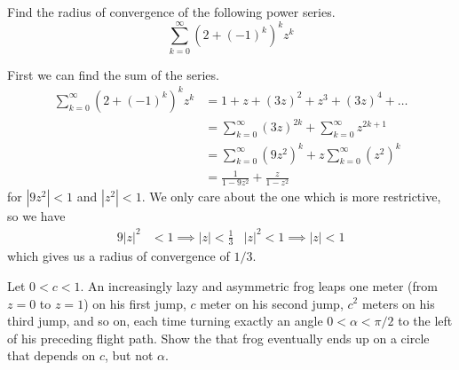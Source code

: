 \documentclass[12pt]{article}
\author{Warren Atkison}
\date{\today}
\newenvironment{exercise}[2][Exercise]{\begin{trivlist}
\item[\hskip \labelsep {\bfseries #1} \hskip \labelsep {\bfseries #2.}]}{\end{trivlist}}
\begin{document}
\fancyhf{}
\fancyhead[R]{\today}
\fancyfoot[R]{\thepage}

\begin{exercise}{5.4.3c}
	Find the radius of convergence of the following power series.
	\[
		\sum_{k=0}^{\infty} \left(2 + (-1)^k\right)^kz^k
	\]
\end{exercise}	
First we can find the sum of the series.
\begin{align*}
	\sum_{k=0}^{\infty} \left(2 + (-1)^k\right)^kz^k &= 1 + z + (3z)^2 + z^3 + (3z)^4 + \ldots \\
							 &= \sum_{k=0}^{\infty} (3z)^{2k} + \sum_{k=0}^{\infty} z^{2k+1} \\
							 &= \sum_{k=0}^{\infty} (9z^2)^k + z\sum_{k=0}^{\infty} (z^2)^k \\
							 &= \frac{1}{1 - 9z^2} + \frac{z}{1 - z^2}
\end{align*}
for $|9z^2| < 1$ and $|z^2| < 1$. We only care about the one which is more restrictive, so we have
\begin{align*}
	9|z|^2 &< 1 \implies |z| < \frac{1}{3} & |z|^2 < 1 \implies |z| < 1
\end{align*}
which gives us a radius of convergence of $1/3$.
\begin{exercise}{5.1.21}
	Let $0 < c < 1$. An increasingly lazy and asymmetric frog leaps one meter (from $z = 0$ to $z = 1$) on his first jump, $c$ meter on his second jump, $c^2$ meters on his third jump, and so on, each time turning exactly an angle $0 < \alpha < \pi/2$ to the left of his preceding flight path. Show the that frog eventually ends up on a circle that depends on $c$, but not $\alpha$.
\end{exercise}
\end{document}
